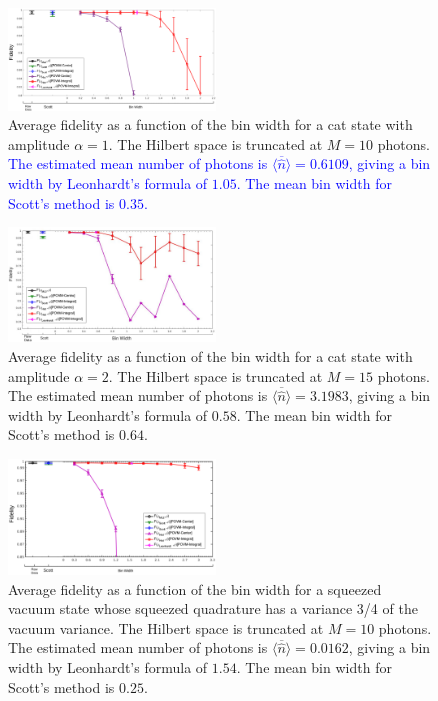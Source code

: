 \documentclass[
reprint,
superscriptaddress,
showpacs,
amsmath,
amssymb,
aps,
pra,
longbibliography
]{revtex4-1}
\providecommand{\editcolor}[2]{\textcolor{#1}{#2}}
\providecommand{\editcolor}[2]{#2}
\newcommand{\HV}[1]{\editcolor{blue}{#1}}
\begin{document}
\begin{figure}
  \includegraphics[width=0.49\textwidth]{catstate-alpha=1-10photons.eps}
  \caption{Average fidelity as a function of the bin width for a cat state
    with amplitude $\alpha = 1$. The Hilbert space is truncated at $M=10$
    photons. \HV{The estimated mean number of photons is $\overline{\langle \hat{n} \rangle}=0.6109$, giving a bin width by Leonhardt's formula of $1.05$. 
The mean bin width for Scott's method is $0.35$.}}
  \label{fig-Fidelity_vs_binwidth_catstate_Mph_10_alpha_1}
\end{figure}

\begin{figure}
  \includegraphics[width=0.49\textwidth]{catstate-alpha=2-15photons.eps}
  \caption{Average fidelity as a function of the bin width for a cat state
    with amplitude $\alpha = 2$. The Hilbert space is truncated at $M=15$
    photons. The estimated mean number of photons is $\overline{\langle \hat{n} \rangle}=3.1983$, giving a bin width by Leonhardt's formula of $0.58$.
    The mean bin width for Scott's method is $0.64$.}
  \label{fig-Fid_vs_binwidth_catstate_alpha_2_Mph_15}
\end{figure}

\begin{figure}
  \includegraphics[width=0.49\textwidth]{squeezedvacuum-10photons-Var=075.eps}
  \caption{Average fidelity as a function of the bin width for a squeezed
    vacuum state whose squeezed quadrature has a variance 3/4 of the
    vacuum variance. The Hilbert space is truncated at $M=10$ photons. 
    The estimated mean number of photons is $\overline{\langle \hat{n} \rangle}=0.0162$, giving a bin width by Leonhardt's formula of $1.54$.
    The mean bin width for Scott's method is $0.25$.}
  \label{fig-squeezed_vacuum_variance_075_Mph_10}
\end{figure}
\end{document}
